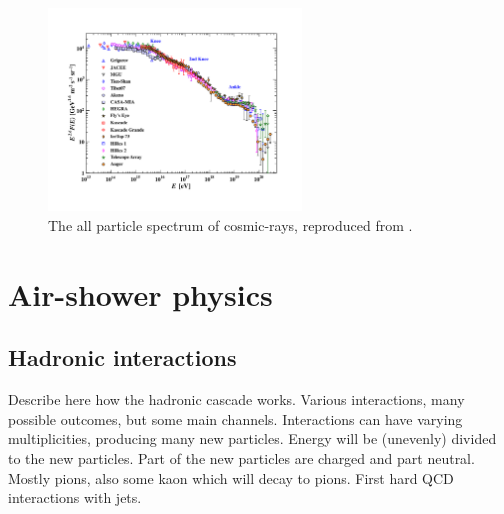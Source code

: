 \begin{figure}
    \centering
    \includegraphics[width=0.6\textwidth]
                    {plots/cosmic-rays/PDG_28_8_all_particle_spectrum}
    \caption{The all particle spectrum of cosmic-rays, reproduced from \cite{olive2014pdg}.}
    \label{fig:spectrum}
\end{figure}


\section{Air-shower physics}
\label{sec:air-shower-physics}

\subsection{Hadronic interactions}

Describe here how the hadronic cascade works. Various interactions, many possible outcomes, but some main channels. Interactions can have varying multiplicities, producing many new particles. Energy will be (unevenly) divided to the new particles. Part of the new particles are charged and part neutral. Mostly pions, also some kaon which will decay to pions. First hard QCD interactions with jets.

